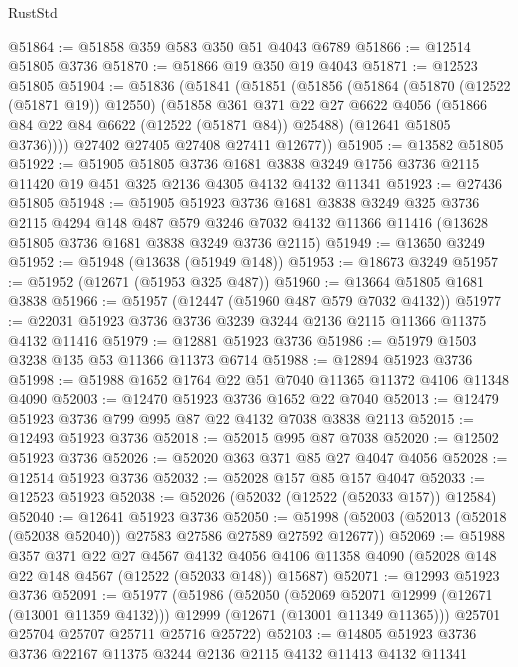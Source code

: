 \begin{lexlean}{RustStd}
\begin{coremodule}
@51864 := @51858 @359 @583 @350 @51 @4043 @6789
@51866 := @12514 @51805 @3736
@51870 := @51866 @19 @350 @19 @4043
@51871 := @12523 @51805
@51904 := @51836
    (@51841
      (@51851
        (@51856
          (@51864
            (@51870 (@12522 (@51871 @19)) @12550)
            (@51858
              @361
              @371
              @22
              @27
              @6622
              @4056
              (@51866 @84 @22 @84 @6622 (@12522 (@51871 @84)) @25488)
              (@12641 @51805 @3736))))
        @27402
        @27405
        @27408
        @27411
        @12677))
@51905 := @13582 @51805
@51922 := @51905
    @51805
    @3736
    @1681
    @3838
    @3249
    @1756
    @3736
    @2115
    @11420
    @19
    @451
    @325
    @2136
    @4305
    @4132
    @4132
    @11341
@51923 := @27436 @51805
@51948 := @51905
    @51923
    @3736
    @1681
    @3838
    @3249
    @325
    @3736
    @2115
    @4294
    @148
    @487
    @579
    @3246
    @7032
    @4132
    @11366
    @11416
    (@13628 @51805 @3736 @1681 @3838 @3249 @3736 @2115)
@51949 := @13650 @3249
@51952 := @51948 (@13638 (@51949 @148))
@51953 := @18673 @3249
@51957 := @51952 (@12671 (@51953 @325 @487))
@51960 := @13664 @51805 @1681 @3838
@51966 := @51957 (@12447 (@51960 @487 @579 @7032 @4132))
@51977 := @22031 @51923 @3736 @3736 @3239 @3244 @2136 @2115 @11366 @11375 @4132 @11416
@51979 := @12881 @51923 @3736
@51986 := @51979 @1503 @3238 @135 @53 @11366 @11373 @6714
@51988 := @12894 @51923 @3736
@51998 := @51988 @1652 @1764 @22 @51 @7040 @11365 @11372 @4106 @11348 @4090
@52003 := @12470 @51923 @3736 @1652 @22 @7040
@52013 := @12479 @51923 @3736 @799 @995 @87 @22 @4132 @7038 @3838 @2113
@52015 := @12493 @51923 @3736
@52018 := @52015 @995 @87 @7038
@52020 := @12502 @51923 @3736
@52026 := @52020 @363 @371 @85 @27 @4047 @4056
@52028 := @12514 @51923 @3736
@52032 := @52028 @157 @85 @157 @4047
@52033 := @12523 @51923
@52038 := @52026 (@52032 (@12522 (@52033 @157)) @12584)
@52040 := @12641 @51923 @3736
@52050 := @51998 (@52003 (@52013 (@52018 (@52038 @52040)) @27583 @27586 @27589 @27592 @12677))
@52069 := @51988
    @357
    @371
    @22
    @27
    @4567
    @4132
    @4056
    @4106
    @11358
    @4090
    (@52028 @148 @22 @148 @4567 (@12522 (@52033 @148)) @15687)
@52071 := @12993 @51923 @3736
@52091 := @51977
    (@51986
      (@52050
        (@52069 @52071 @12999 (@12671 (@13001 @11359 @4132)))
        @12999
        (@12671 (@13001 @11349 @11365)))
      @25701
      @25704
      @25707
      @25711
      @25716
      @25722)
@52103 := @14805 @51923 @3736 @3736 @22167 @11375 @3244 @2136 @2115 @4132 @11413 @4132 @11341

\end{coremodule}
\end{lexlean}
